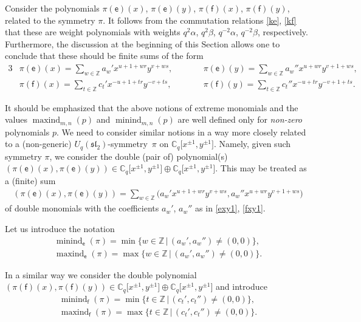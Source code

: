 \documentclass[pdftex]{sigma}
\numberwithin{equation}{section}
\begin{document}
Consider the polynomials $\pi(\mathsf{e})(x)$, $\pi(\mathsf{e})(y)$, $\pi(\mathsf{f})(x)$, $\pi(\mathsf{f})(y)$, related to the symmetry $\pi$. It follows from the commutation relations \eqref{ke}, \eqref{kf} that these are weight polynomials with weights $q^2\alpha$, $q^2\beta$, $q^{-2}\alpha$, $q^{-2}\beta$, respectively. Furthermore, the discussion at the beginning of this Section allows one to conclude that these should be finite sums of the form
\begin{alignat}{3}
&\pi(\mathsf{e})(x)=\sum_{w\in\mathbb{Z}}a_w'x^{u+1+wr}y^{v+ws}, \qquad && \pi(\mathsf{e})(y) =\sum_{w\in\mathbb{Z}}a_w''x^{u+wr}y^{v+1+ws}, & \label{exy1}\\
& \pi(\mathsf{f})(x) =\sum_{t\in\mathbb{Z}}c_t'x^{-u+1+tr}y^{-v+ts},\qquad && \pi(\mathsf{f})(y) =\sum_{t\in\mathbb{Z}}c_t''x^{-u+tr}y^{-v+1+ts}. & \label{fxy1}
\end{alignat}

It should be emphasized that the above notions of extreme monomials and the values \linebreak $\operatorname{maxind}_{m,n}(p)$ and $\operatorname{minind}_{m,n}(p)$ are well defined only for {\it non-zero} polynomials $p$. We need to consider similar notions in a way more closely related to a (non-generic) $U_q(\mathfrak{sl}_2)$-symmet\-ry~$\pi$ on $\mathbb{C}_q\big[x^{\pm 1},y^{\pm 1}\big]$. Namely, given such symmetry $\pi$, we consider the double (pair of) polynomial(s) $(\pi(\mathsf{e})(x),\pi(\mathsf{e})(y))\in\mathbb{C}_q\big[x^{\pm 1},y^{\pm 1}\big]\oplus\mathbb{C}_q\big[x^{\pm 1},y^{\pm 1}\big]$. This may be treated as a (finite) sum
\begin{gather*}
(\pi(\mathsf{e})(x),\pi(\mathsf{e})(y))=
\sum_{w\in\mathbb{Z}}\big(a_w'x^{u+1+wr}y^{v+ws},a_w''x^{u+wr}y^{v+1+ws}\big)
\end{gather*}
of double monomials with the coefficients $a_w'$, $a_w''$ as in \eqref{exy1}, \eqref{fxy1}.

Let us introduce the notation
\begin{gather*}
\operatorname{minind}_\mathsf{e}(\pi) =\min\{w\in\mathbb{Z}\,|\,(a_w',a_w'')\ne(0,0)\}, \\
 \operatorname{maxind}_\mathsf{e}(\pi) =\max\{w\in\mathbb{Z}\,|\,(a_w',a_w'')\ne(0,0)\}.
\end{gather*}

In a similar way we consider the double polynomial $(\pi(\mathsf{f})(x),\pi(\mathsf{f})(y))\in\mathbb{C}_q\big[x^{\pm 1},y^{\pm 1}\big]\oplus\mathbb{C}_q\big[x^{\pm 1},y^{\pm 1}\big]$ and introduce
\begin{gather*}
\operatorname{minind}_\mathsf{f}(\pi) =\min\{t\in\mathbb{Z}\,|\,(c_t',c_t'')\ne(0,0)\},\\
\operatorname{maxind}_\mathsf{f}(\pi) =\max\{t\in\mathbb{Z}\,|\,(c_t',c_t'')\ne(0,0)\}.
\end{gather*}
\end{document}
